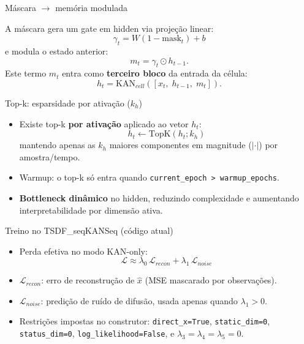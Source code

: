 \documentclass[10pt]{beamer}
\begin{document}
\begin{frame}{M\'ascara $\rightarrow$ mem\'oria modulada}
\small

A m\'ascara gera um gate em hidden via proje\c{c}\~ao linear:
\[
\gamma_t = W(1-\mathrm{mask}_t) + b
\]
e modula o estado anterior:
\[
m_t = \gamma_t \odot h_{t-1}.
\]
Este termo $m_t$ entra como \textbf{terceiro bloco} da entrada da c\'elula:
\[
h_t = \mathrm{KAN}_{cell}([x_t,\; h_{t-1},\; m_t]).
\]

\end{frame}

\begin{frame}{Top-k: esparsidade por ativa\c{c}\~ao ($k_h$)}
\small
\begin{itemize}
\item Existe top-k \textbf{por ativa\c{c}\~ao} aplicado ao vetor $h_t$:
\[
h_t \leftarrow \mathrm{TopK}(h_t; k_h)
\]
mantendo apenas as $k_h$ maiores componentes em magnitude ($|\cdot|$) por amostra/tempo.
\item Warmup: o top-k s\'o entra quando \texttt{current\_epoch > warmup\_epochs}.

\item \textbf{Bottleneck din\^amico} no hidden, reduzindo complexidade e aumentando interpretabilidade por dimens\~ao ativa.
\end{itemize}



\end{frame}

\begin{frame}{Treino no TSDF\_seqKANSeq (c\'odigo atual)}
\small
\begin{itemize}
\item Perda efetiva no modo KAN-only:
\[
\mathcal{L} \approx \lambda_0\,\mathcal{L}_{recon} + \lambda_1\,\mathcal{L}_{noise}
\]
\item $\mathcal{L}_{recon}$: erro de reconstru\c{c}\~ao de $\hat{x}$ (MSE mascarado por observa\c{c}\~oes).
\item $\mathcal{L}_{noise}$: predi\c{c}\~ao de ru\'ido de difus\~ao, usada apenas quando $\lambda_1>0$.
\item Restri\c{c}\~oes impostas no construtor: \texttt{direct\_x=True}, \texttt{static\_dim=0}, \texttt{status\_dim=0}, \texttt{log\_likelihood=False}, e $\lambda_3=\lambda_4=\lambda_5=0$.
\end{itemize}
\end{frame}
\end{document}
